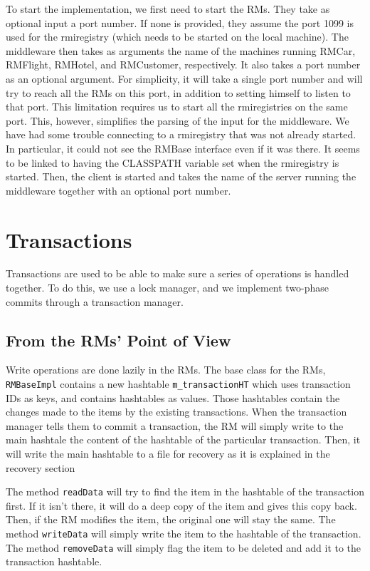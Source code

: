 \documentclass[12pt]{article}
\theoremstyle{plain}%
\theoremstyle{definition}
\theoremstyle{remark}
\newcommand{\java}[1]{{\lstinline!#1!}}
\begin{document}
To start the implementation, we first need to start the RMs. They take
as optional input a port number. If none is provided, they assume the
port 1099 is used for the rmiregistry (which needs to be started on
the local machine). The middleware then takes as arguments the name of
the machines running RMCar, RMFlight, RMHotel, and RMCustomer,
respectively. It also takes a port number as an optional argument. For
simplicity, it will take a single port number and will try to reach
all the RMs on this port, in addition to setting himself to listen to
that port. This limitation requires us to start all the rmiregistries
on the same port. This, however, simplifies the parsing of the input
for the middleware. We have had some trouble connecting to a
rmiregistry that was not already started. In particular, it could not
see the RMBase interface even if it was there. It seems to be linked to
having the CLASSPATH variable set when the rmiregistry is started.
Then, the client is started and takes the name of the server running
the middleware together with an optional port number.

\section{Transactions}

Transactions are used to be able to make sure a series of operations is 
handled together. To do this, we use a lock manager, and we implement
two-phase commits through a transaction manager.

\subsection*{From the RMs' Point of View\label{sec:rm}}

Write operations are done lazily in the RMs. The base class for the RMs, 
\java{RMBaseImpl} contains a new hashtable \java{m_transactionHT} which 
uses transaction IDs as keys, and contains hashtables as values. Those 
hashtables contain the changes made to the items by the existing 
transactions. When the transaction manager tells them to commit a 
transaction, the RM will simply write to the main hashtale the content 
of the hashtable of the particular transaction. Then, it will write
the main hashtable to a file for recovery as it is explained in the
recovery section %

The method \java{readData} will try to find the item in the hashtable 
of the transaction first. If it isn't there, it will do a deep copy of 
the item and gives this copy back. Then, if the RM modifies the item, 
the original one will stay the same. The method \java{writeData} will 
simply write the item to the hashtable of the transaction. The method 
\java{removeData} will simply flag the item to be deleted and add it 
to the transaction hashtable.
\end{document}
